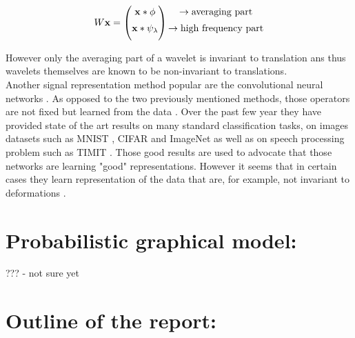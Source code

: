 \documentclass[a4paper,11pt]{report}
\begin{document}
			\begin{equation}
				\begin{matrix}
					W{\bf x} =
					\begin{pmatrix}
						{\bf x} \ast \phi \\[0.5em]
						{\bf x} \ast \psi_{\lambda} \\[0.5em]
					\end{pmatrix}
					\begin{aligned}
						\begin{matrix}
							\rightarrow \text{averaging part}				\\[0.5em]
							\rightarrow \text{high frequency part}	\\[0.5em]
						\end{matrix}
					\end{aligned}
				\end{matrix}
			\end{equation}
		

			However only the averaging part of a wavelet is invariant to translation ans thus wavelets themselves are known to be non-invariant to translations.\\
			
			Another signal representation method popular are the convolutional neural networks \cite{lecun1995convolutional}. As opposed to the two previously mentioned methods, those operators are not fixed but learned from the data \cite{simard2003best}. Over the past few year they have provided state of the art results on many standard classification tasks, on images datasets such as MNIST , CIFAR \cite{hinton2012improving} and ImageNet \cite{krizhevsky2012imagenet} as well as on speech processing problem such as TIMIT \cite{abdel2012applying}. Those good results are used to advocate that those networks are learning "good" representations. However it seems that in certain cases they learn representation of the data that are, for example, not invariant to deformations \cite{szegedy2013intriguing}.\\
			         
	\section{Probabilistic graphical model:}
		??? - not sure yet
		
	\section{Outline of the report:}
    \label{sec:Intro/Outline of the report}    
    
\end{document}
